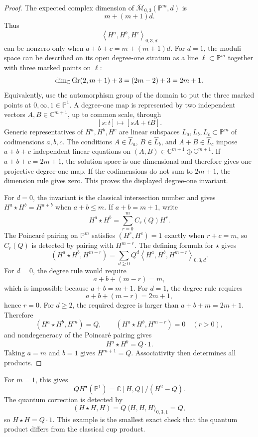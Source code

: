 \begin{proof}
The expected complex dimension of
\(\overline{\mathcal M}_{0,3}(\mathbb P^m,d)\) is
\[
  m+(m+1)d.
\]
Thus
\[
  \left\langle H^a,H^b,H^c\right\rangle_{0,3,d}
\]
can be nonzero only when \(a+b+c=m+(m+1)d\).  For \(d=1\), the moduli space can
be described on its open degree-one stratum as a line
\(\ell\subset\mathbb P^m\) together with three marked points on \(\ell\):
\[
  \dim_\mathbb C{\rm Gr}(2,m+1)+3=(2m-2)+3=2m+1.
\]
Equivalently, use the automorphism group of the domain to put the three marked
points at \(0,\infty,1\in\mathbb P^1\).  A degree-one map is represented by
two independent vectors \(A,B\in\mathbb C^{m+1}\), up to common scale, through
\[
  [s:t]\longmapsto [sA+tB].
\]
Generic representatives of \(H^a,H^b,H^c\) are linear subspaces
\(L_a,L_b,L_c\subset\mathbb P^m\) of codimensions \(a,b,c\).  The conditions
\(A\in\widehat L_a\), \(B\in\widehat L_b\), and
\(A+B\in\widehat L_c\) impose \(a+b+c\) independent linear equations on
\((A,B)\in\mathbb C^{m+1}\oplus\mathbb C^{m+1}\).  If
\(a+b+c=2m+1\), the solution space is one-dimensional and therefore gives one
projective degree-one map.  If the codimensions do not sum to \(2m+1\), the
dimension rule gives zero.  This proves the displayed degree-one invariant.

For \(d=0\), the invariant is the classical intersection number and gives
\(H^a\star H^b=H^{a+b}\) when \(a+b\le m\).  If \(a+b=m+1\), write
\[
  H^a\star H^b=\sum_{r=0}^{m} C_r(Q)H^r .
\]
The Poincar\'e pairing on \(\mathbb P^m\) satisfies
\((H^r,H^c)=1\) exactly when \(r+c=m\), so \(C_r(Q)\) is detected by pairing
with \(H^{m-r}\).  The defining formula for \(\star\) gives
\[
  (H^a\star H^b,H^{m-r})
  =
  \sum_{d\ge0}Q^d
  \left\langle H^a,H^b,H^{m-r}\right\rangle_{0,3,d}.
\]
For \(d=0\), the degree rule would require
\[
  a+b+(m-r)=m,
\]
which is impossible because \(a+b=m+1\).  For \(d=1\), the degree rule
requires
\[
  a+b+(m-r)=2m+1,
\]
hence \(r=0\).  For \(d\ge2\), the required degree is larger than
\(a+b+m=2m+1\).  Therefore
\[
  (H^a\star H^b,H^m)=Q,
  \qquad
  (H^a\star H^b,H^{m-r})=0\quad (r>0),
\]
and nondegeneracy of the Poincar\'e pairing gives
\[
  H^a\star H^b=Q\cdot 1 .
\]
Taking \(a=m\) and \(b=1\) gives \(H^{m+1}=Q\).  Associativity then determines
all products.
\end{proof}

For \(m=1\), this gives
\[
  QH^\bullet(\mathbb P^1)=\mathbb C[H,Q]/(H^2-Q).
\]
The quantum correction is detected by
\[
  (H\star H,H)
  =
  Q\,\langle H,H,H\rangle_{0,3,1}
  =
  Q,
\]
so \(H\star H=Q\cdot 1\).  This example is the smallest exact check that the
quantum product differs from the classical cup product.

